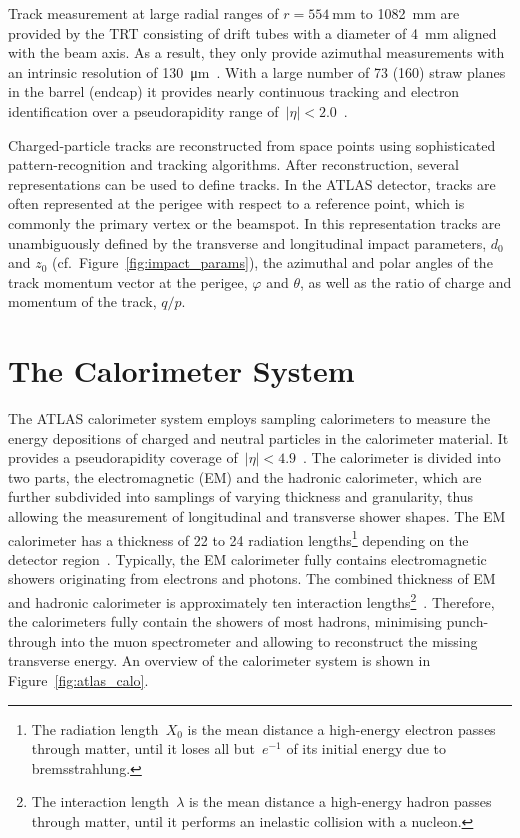 Track measurement at large radial ranges of $r = \SI{554}{\milli\metre}$ to
\SI{1082}{\milli\metre} are provided by the TRT consisting of drift tubes with a
diameter of \SI{4}{\milli\metre} aligned with the beam axis. As a result, they
only provide azimuthal measurements with an intrinsic resolution of
\SI{130}{\micro\metre}~\cite{atlas_detector}. With a large number of 73 (160)
straw planes in the barrel (endcap) it provides nearly continuous tracking and
electron identification over a pseudorapidity range
of~$|\eta| < 2.0$~\cite{atlas_detector}.

Charged-particle tracks are reconstructed from space points using sophisticated
pattern-recognition and tracking algorithms. After reconstruction, several
representations can be used to define tracks. In the ATLAS detector, tracks are
often represented at the perigee with respect to a reference point, which is
commonly the primary vertex or the beamspot. In this representation tracks are
unambiguously defined by the transverse and longitudinal impact parameters,
$d_0$ and $z_0$ (cf.\ Figure~\ref{fig:impact_params}), the azimuthal and polar
angles of the track momentum vector at the perigee, $\varphi$ and $\theta$, as
well as the ratio of charge and momentum of the track, $q / p$.


\section{The Calorimeter System}
\label{sec:atlas_calo}

The ATLAS calorimeter system employs sampling calorimeters to measure the energy
depositions of charged and neutral particles in the calorimeter material. It
provides a pseudorapidity coverage
of~\mbox{$|\eta| < 4.9$}~\cite{atlas_detector}. The calorimeter is divided into
two parts, the electromagnetic (EM) and the hadronic calorimeter, which are
further subdivided into samplings of varying thickness and granularity, thus
allowing the measurement of longitudinal and transverse shower shapes. The EM
calorimeter has a thickness of 22 to 24 radiation lengths\footnote{The radiation
  length~$X_0$ is the mean distance a high-energy electron passes through
  matter, until it loses all but~$e^{-1}$ of its initial energy due to
  bremsstrahlung.} depending on the detector region~\cite{atlas_detector}.
Typically, the EM calorimeter fully contains electromagnetic showers originating
from electrons and photons. The combined thickness of EM and hadronic
calorimeter is approximately ten interaction lengths\footnote{The interaction
  length~$\lambda$ is the mean distance a high-energy hadron passes through
  matter, until it performs an inelastic collision with a
  nucleon.}~\cite{atlas_detector}. Therefore, the calorimeters fully contain the
showers of most hadrons, minimising punch-through into the muon spectrometer and
allowing to reconstruct the missing transverse energy. An overview of the
calorimeter system is shown in Figure~\ref{fig:atlas_calo}.

